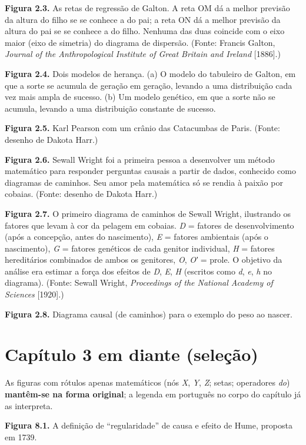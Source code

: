 \documentclass[11pt,a5paper,twoside]{book}
\begin{document}
\textbf{Figura 2.3.} As retas de regressão de Galton. A reta OM dá a melhor previsão da altura do filho se se conhece a do pai; a reta ON dá a melhor previsão da altura do pai se se conhece a do filho. Nenhuma das duas coincide com o eixo maior (eixo de simetria) do diagrama de dispersão. (Fonte: Francis Galton, \textit{Journal of the Anthropological Institute of Great Britain and Ireland} [1886].)

\textbf{Figura 2.4.} Dois modelos de herança. (a) O modelo do tabuleiro de Galton, em que a sorte se acumula de geração em geração, levando a uma distribuição cada vez mais ampla de sucesso. (b) Um modelo genético, em que a sorte não se acumula, levando a uma distribuição constante de sucesso.

\textbf{Figura 2.5.} Karl Pearson com um crânio das Catacumbas de Paris. (Fonte: desenho de Dakota Harr.)

\textbf{Figura 2.6.} Sewall Wright foi a primeira pessoa a desenvolver um método matemático para responder perguntas causais a partir de dados, conhecido como diagramas de caminhos. Seu amor pela matemática só se rendia à paixão por cobaias. (Fonte: desenho de Dakota Harr.)

\textbf{Figura 2.7.} O primeiro diagrama de caminhos de Sewall Wright, ilustrando os fatores que levam à cor da pelagem em cobaias. \textit{D} = fatores de desenvolvimento (após a concepção, antes do nascimento), \textit{E} = fatores ambientais (após o nascimento), \textit{G} = fatores genéticos de cada genitor individual, \textit{H} = fatores hereditários combinados de ambos os genitores, \textit{O}, \textit{O′} = prole. O objetivo da análise era estimar a força dos efeitos de \textit{D}, \textit{E}, \textit{H} (escritos como \textit{d}, \textit{e}, \textit{h} no diagrama). (Fonte: Sewall Wright, \textit{Proceedings of the National Academy of Sciences} [1920].)

\textbf{Figura 2.8.} Diagrama causal (de caminhos) para o exemplo do peso ao nascer.

\section{Capítulo 3 em diante (seleção)}
As figuras com rótulos apenas matemáticos (nós \textit{X}, \textit{Y}, \textit{Z}; setas; operadores \textit{do}) \textbf{mantêm-se na forma original}; a legenda em português no corpo do capítulo já as interpreta.

\textbf{Figura 8.1.} A definição de “regularidade” de causa e efeito de Hume, proposta em 1739.
\end{document}
